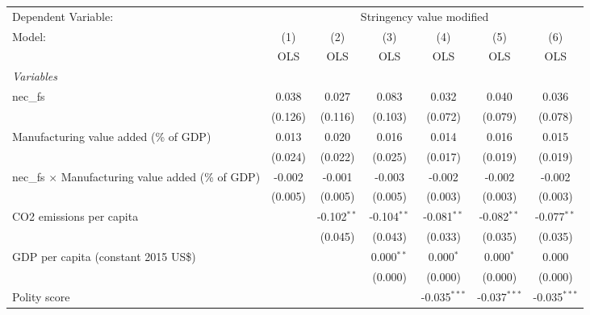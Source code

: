 
\begingroup
\centering
\begin{tabular}{lcccccc}
   \toprule
   Dependent Variable: & \multicolumn{6}{c}{Stringency value modified}\\
   Model:                                                    & (1)     & (2)           & (3)           & (4)            & (5)            & (6)\\  
                                                             &  OLS    & OLS           & OLS           & OLS            & OLS            & OLS\\  
   \midrule
   \emph{Variables}\\
   nec\_fs                                                   & 0.038   & 0.027         & 0.083         & 0.032          & 0.040          & 0.036\\   
                                                             & (0.126) & (0.116)       & (0.103)       & (0.072)        & (0.079)        & (0.078)\\   
   Manufacturing value added (\% of GDP)                     & 0.013   & 0.020         & 0.016         & 0.014          & 0.016          & 0.015\\   
                                                             & (0.024) & (0.022)       & (0.025)       & (0.017)        & (0.019)        & (0.019)\\   
   nec\_fs $\times$ Manufacturing value added (\% of GDP)    & -0.002  & -0.001        & -0.003        & -0.002         & -0.002         & -0.002\\   
                                                             & (0.005) & (0.005)       & (0.005)       & (0.003)        & (0.003)        & (0.003)\\   
   CO2 emissions per capita                                  &         & -0.102$^{**}$ & -0.104$^{**}$ & -0.081$^{**}$  & -0.082$^{**}$  & -0.077$^{**}$\\   
                                                             &         & (0.045)       & (0.043)       & (0.033)        & (0.035)        & (0.035)\\   
   GDP per capita (constant 2015 US\$)                       &         &               & 0.000$^{**}$  & 0.000$^{*}$    & 0.000$^{*}$    & 0.000\\   
                                                             &         &               & (0.000)       & (0.000)        & (0.000)        & (0.000)\\   
   Polity score                                              &         &               &               & -0.035$^{***}$ & -0.037$^{***}$ & -0.035$^{***}$\\   

\end{tabular}
